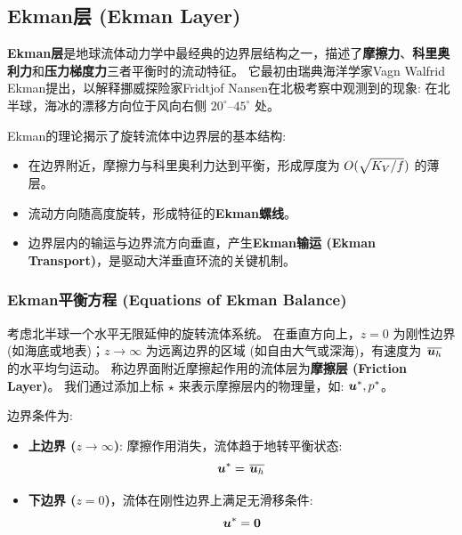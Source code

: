 \subsection{Ekman层 (Ekman Layer)}

\textbf{Ekman层}是地球流体动力学中最经典的边界层结构之一，描述了\textbf{摩擦力}、\textbf{科里奥利力}和\textbf{压力梯度力}三者平衡时的流动特征。
它最初由瑞典海洋学家Vagn Walfrid Ekman提出，以解释挪威探险家Fridtjof Nansen在北极考察中观测到的现象: 在北半球，海冰的漂移方向位于风向右侧 $20^\circ \text{--} 45^\circ$ 处。

Ekman的理论揭示了旋转流体中边界层的基本结构:
\begin{itemize}
    \item 在边界附近，摩擦力与科里奥利力达到平衡，形成厚度为 $O(\sqrt{K_V/f})$ 的薄层。
    \item 流动方向随高度旋转，形成特征的\textbf{Ekman螺线}。
    \item 边界层内的输运与边界流方向垂直，产生\textbf{Ekman输运 (Ekman Transport)}，是驱动大洋垂直环流的关键机制。
\end{itemize}

\subsubsection{Ekman平衡方程 (Equations of Ekman Balance)}

考虑北半球一个水平无限延伸的旋转流体系统。
在垂直方向上，$z = 0$ 为刚性边界 (如海底或地表)；$z \to \infty$ 为远离边界的区域 (如自由大气或深海)，有速度为 $\mkern2mu \overline{\bm{u}_h} \mkern2mu$ 的水平均匀运动。
称边界面附近摩擦起作用的流体层为\textbf{摩擦层 (Friction Layer)}。
我们通过添加上标 $\star$ 来表示摩擦层内的物理量，如: $\bm{u}^*, p^*$。

边界条件为:
\begin{itemize}
    \item \textbf{上边界 ($z \to \infty$)}:
    摩擦作用消失，流体趋于地转平衡状态:
    \begin{equation}
        \bm{u}^* = \mkern2mu \overline{\bm{u}_h} \mkern2mu
        \label{eq:ekman_boundary_condition_top}
    \end{equation}

    \item \textbf{下边界 ($z = 0$)}，流体在刚性边界上满足无滑移条件:
    \begin{equation}
        \bm{u}^* = \bm{0}
        \label{eq:ekman_boundary_condition_bottom}
    \end{equation}
\end{itemize}

